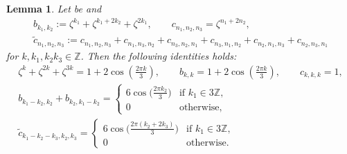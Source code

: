 \documentclass[pdftex]{sigma}
\numberwithin{equation}{section}
\newtheorem{Lemma}[Theorem]{Lemma}
\begin{document}
\begin{Lemma}\label{lemma of exp 2pi 3}
Let be  and
\begin{gather*}
b_{k_1,k_2}:=\zeta^{k_1}+\zeta^{k_1+2k_2}+\zeta^{2k_1},\qquad
c_{n_1,n_2,n_3}=\zeta^{n_1+2n_2},\\
\tilde c_{n_1,n_2,n_3}:=c_{n_1,n_2,n_3}+c_{n_1,n_3,n_2}+c_{n_3,n_2,n_1}+c_{n_3,n_1,n_2}+c_{n_2,n_1,n_3}+c_{n_2,n_3,n_1}
\end{gather*}
for $k,k_1,k_2 k_3 \in \mathbb{Z}$. Then the following identities holds:
\begin{gather}
\zeta^{k}+\zeta^{2k}+\zeta^{3k}=1+2\cos\left(\frac{2\pi k}{3} \right),\qquad
b_{k,k}=1+2\cos\left(\frac{2\pi k}{3} \right),\qquad
c_{k,k,k}=1,
\nonumber\\
 b_{k_1-k_2,k_2}+b_{k_2,k_1-k_2}=
\begin{cases}
 6\cos\bigl( \frac{2\pi k_2}{3}\bigr)& \text{if } k_1\in 3\mathbb{Z},\\
 0 & \text{otherwise},
\end{cases}\nonumber
\\
\tilde c_{k_1-k_2-k_3,k_2,k_3}=
\begin{cases}
 6\cos\bigl( \frac{2\pi (k_2+2k_3)}{3}\bigr)& \text{if } k_1\in 3\mathbb{Z},\\
 0 & \text{otherwise}.
\end{cases}\label{exp 2pi 3 id}
\end{gather}
\end{Lemma}
\end{document}
